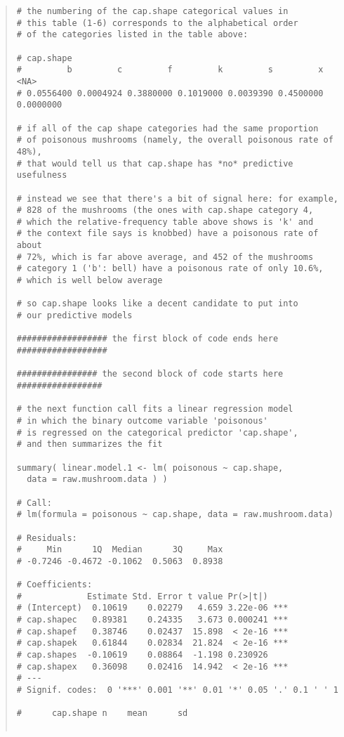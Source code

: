 \documentclass[12pt]{article}
\begin{document}
\begin{quote}
\begin{verbatim}
# the numbering of the cap.shape categorical values in
# this table (1-6) corresponds to the alphabetical order
# of the categories listed in the table above:

# cap.shape
#         b         c         f         k         s         x      <NA> 
# 0.0556400 0.0004924 0.3880000 0.1019000 0.0039390 0.4500000 0.0000000

# if all of the cap shape categories had the same proportion
# of poisonous mushrooms (namely, the overall poisonous rate of 48%),
# that would tell us that cap.shape has *no* predictive usefulness

# instead we see that there's a bit of signal here: for example,
# 828 of the mushrooms (the ones with cap.shape category 4,
# which the relative-frequency table above shows is 'k' and
# the context file says is knobbed) have a poisonous rate of about
# 72%, which is far above average, and 452 of the mushrooms
# category 1 ('b': bell) have a poisonous rate of only 10.6%,
# which is well below average

# so cap.shape looks like a decent candidate to put into
# our predictive models

################## the first block of code ends here ##################

################ the second block of code starts here #################

# the next function call fits a linear regression model
# in which the binary outcome variable 'poisonous'
# is regressed on the categorical predictor 'cap.shape',
# and then summarizes the fit

summary( linear.model.1 <- lm( poisonous ~ cap.shape, 
  data = raw.mushroom.data ) )

# Call:
# lm(formula = poisonous ~ cap.shape, data = raw.mushroom.data)

# Residuals:
#     Min      1Q  Median      3Q     Max 
# -0.7246 -0.4672 -0.1062  0.5063  0.8938 

# Coefficients:
#             Estimate Std. Error t value Pr(>|t|)    
# (Intercept)  0.10619    0.02279   4.659 3.22e-06 ***
# cap.shapec   0.89381    0.24335   3.673 0.000241 ***
# cap.shapef   0.38746    0.02437  15.898  < 2e-16 ***
# cap.shapek   0.61844    0.02834  21.824  < 2e-16 ***
# cap.shapes  -0.10619    0.08864  -1.198 0.230926    
# cap.shapex   0.36098    0.02416  14.942  < 2e-16 ***
# ---
# Signif. codes:  0 '***' 0.001 '**' 0.01 '*' 0.05 '.' 0.1 ' ' 1

#      cap.shape n    mean      sd       


\end{verbatim}
\end{quote}
\end{document}

